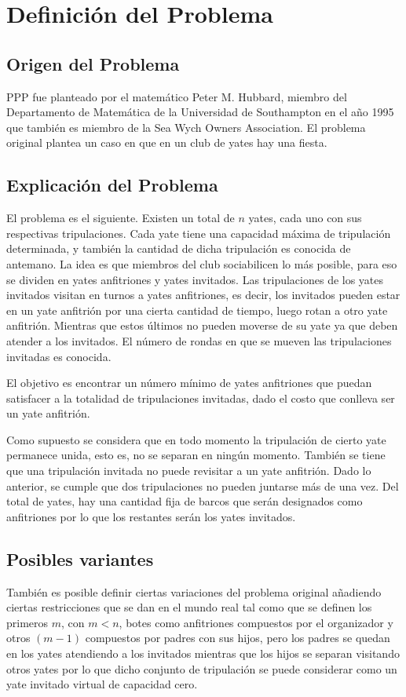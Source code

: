 \documentclass[letter, 10pt]{article}
\begin{document}
\section{Definición del Problema}
\subsection{Origen del Problema}
PPP fue planteado por el matemático Peter M. Hubbard\cite{Smith1996}, miembro del Departamento de Matemática de la Universidad de Southampton en el año 1995 que también es miembro de la Sea Wych Owners Association. El problema original plantea un caso en que en un club de yates hay una fiesta. 


\subsection{Explicación del Problema}
El problema es el siguiente. Existen un total de $n$ yates, cada uno con sus respectivas tripulaciones. Cada yate tiene una capacidad máxima de tripulación determinada, y también la cantidad de dicha tripulación es conocida de antemano. La idea es que miembros del club sociabilicen lo más posible, para eso se dividen en yates anfitriones y yates invitados. Las tripulaciones de los yates invitados visitan en turnos a yates anfitriones, es decir, los invitados pueden estar en un yate anfitrión por una cierta cantidad de tiempo, luego rotan a otro yate anfitrión. Mientras que estos últimos no pueden moverse de su yate ya que deben atender a los invitados. El número de rondas en que se mueven las tripulaciones invitadas es conocida.

El objetivo es encontrar un número mínimo de yates anfitriones que puedan satisfacer a la totalidad de tripulaciones invitadas, dado el costo que conlleva ser un yate anfitrión\cite{Smith1996}.

Como supuesto se considera que en todo momento la tripulación de cierto yate permanece unida, esto es, no se separan en ningún momento. También se tiene que una tripulación invitada no puede revisitar a un yate anfitrión. Dado lo anterior, se cumple que dos tripulaciones no pueden juntarse más de una vez. Del total de yates, hay una cantidad fija de barcos que serán designados como anfitriones por lo que los restantes serán los yates invitados.

\subsection{Posibles variantes}
También es posible definir ciertas variaciones del problema original añadiendo ciertas restricciones que se dan en el mundo real\cite{Kalvelagen20031713}\cite{Smith1996} tal como que se definen los primeros $m$, con $m<n$, botes como anfitriones compuestos por el organizador y otros $(m-1)$ compuestos por padres con sus hijos, pero los padres se quedan en los yates atendiendo a los invitados mientras que los hijos se separan visitando otros yates por lo que dicho conjunto de tripulación se puede considerar como un yate invitado virtual de capacidad cero.
\end{document}
